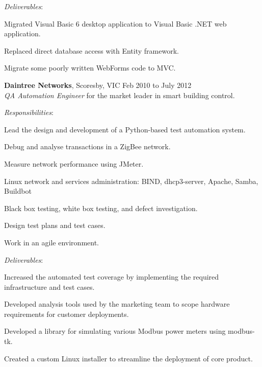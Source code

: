 \documentclass[line,margin]{res}
\begin{document}
\begin{resume}
        \textit{Deliverables}:
        \begin{list}{}{\leftmargin=1em \itemsep=-2pt}
            \item{Migrated Visual Basic 6 desktop application to Visual Basic .NET web application.}
            \item{Replaced direct database access with Entity framework.}
            \item{Migrate some poorly written WebForms code to MVC.}
        \end{list}

        \textbf{Daintree Networks}, Scoresby, VIC \hfill Feb 2010 to July 2012 \\
        \textit{QA Automation Engineer} for the market leader in smart building control.

        \textit{Responsibilities}:
        \begin{list}{}{\leftmargin=1em \itemsep=-2pt}
            \item{Lead the design and development of a Python-based test automation system.}
            \item{Debug and analyse transactions in a ZigBee network.}
            \item{Measure network performance using JMeter.}
            \item{Linux network and services administration: BIND, dhcp3-server, Apache, Samba, Buildbot}
            \item{Black box testing, white box testing, and defect investigation.}
            \item{Design test plans and test cases.}
            \item{Work in an agile environment.}
        \end{list}
             
        \textit{Deliverables}:
        \begin{list}{}{\leftmargin=1em \itemsep=-2pt}
            \item{Increased the automated test coverage by implementing the required infrastructure and
            test cases.}
            \item{Developed analysis tools used by the marketing team to scope hardware
            requirements for customer deployments.}
            \item{Developed a library for simulating various Modbus power meters using modbus-tk.}
            \item{Created a custom Linux installer to streamline the deployment of core product.}
        \end{list}


\end{resume}
\end{document}

